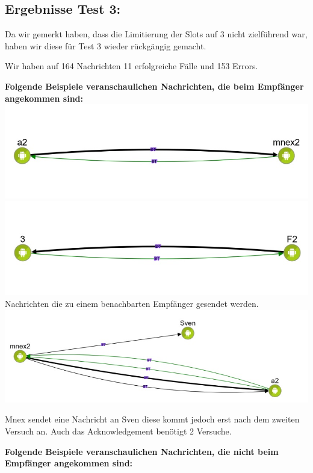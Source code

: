 \clearpage\subsection{Ergebnisse Test 3:}\label{ergebnisse-test-3}

Da wir gemerkt haben, dass die Limitierung der Slots auf 3 nicht
zielführend war, haben wir diese für Test 3 wieder rückgängig gemacht.

Wir haben auf 164 Nachrichten 11 erfolgreiche Fälle und 153 Errors.

\textbf{Folgende Beispiele veranschaulichen Nachrichten, die beim
Empfänger angekommen sind:}
\includegraphics[width=1.0\textwidth]{belege/grosstests/Bilder/Grosstest2/Test3Erfolg1.jpg}
\includegraphics[width=1.0\textwidth]{belege/grosstests/Bilder/Grosstest2/Test3Erfolg2.jpg}
Nachrichten die zu einem benachbarten Empfänger gesendet werden.
\includegraphics[width=1.0\textwidth]{belege/grosstests/Bilder/Grosstest2/Test3Erfolg3.jpg}

Mnex sendet eine Nachricht an Sven diese kommt jedoch erst nach dem
zweiten Versuch an. Auch das Acknowledgement benötigt 2 Versuche.

\textbf{Folgende Beispiele veranschaulichen Nachrichten, die nicht beim
Empfänger angekommen sind:}


